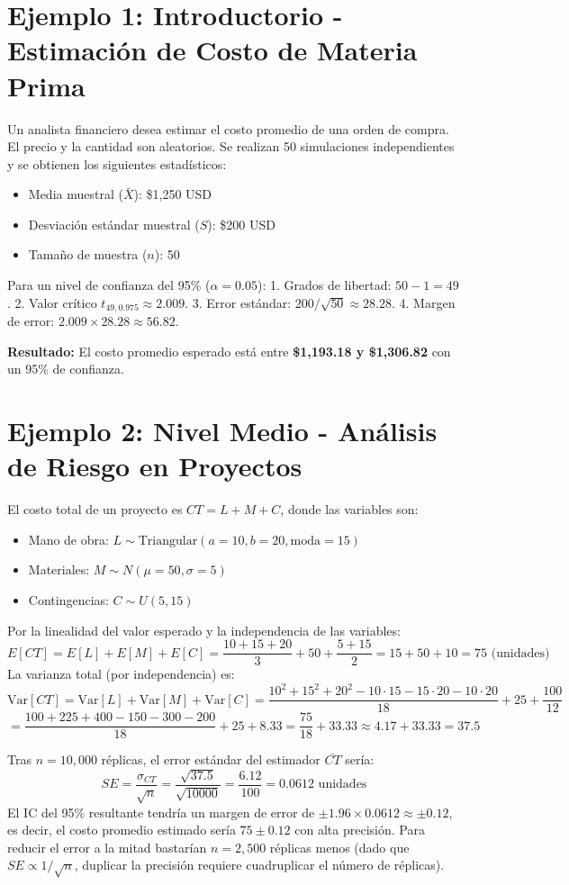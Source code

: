 \documentclass[11pt, letterpaper]{article}
\begin{document}
\section{Ejemplo 1: Introductorio - Estimación de Costo de Materia Prima}
Un analista financiero desea estimar el costo promedio de una orden de compra. El precio y la cantidad son aleatorios. Se realizan 50 simulaciones independientes y se obtienen los siguientes estadísticos:
\begin{itemize}
    \item Media muestral ($\bar{X}$): \$1,250 USD
    \item Desviación estándar muestral ($S$): \$200 USD
    \item Tamaño de muestra ($n$): 50
\end{itemize}

Para un nivel de confianza del 95\% ($\alpha = 0.05$):
1. Grados de libertad: $50 - 1 = 49$.
2. Valor crítico $t_{49, 0.975} \approx 2.009$.
3. Error estándar: $200 / \sqrt{50} \approx 28.28$.
4. Margen de error: $2.009 \times 28.28 \approx 56.82$.

\textbf{Resultado:} El costo promedio esperado está entre \textbf{\$1,193.18 y \$1,306.82} con un 95\% de confianza.

\section{Ejemplo 2: Nivel Medio - Análisis de Riesgo en Proyectos}
El costo total de un proyecto es $CT = L + M + C$, donde las variables son:
\begin{itemize}
    \item Mano de obra: $L \sim \text{Triangular}(a=10, b=20, \text{moda}=15)$
    \item Materiales: $M \sim N(\mu=50, \sigma=5)$
    \item Contingencias: $C \sim U(5, 15)$
\end{itemize}
Por la linealidad del valor esperado y la independencia de las variables:
\[ E[CT] = E[L] + E[M] + E[C] = \frac{10+15+20}{3} + 50 + \frac{5+15}{2} = 15 + 50 + 10 = 75 \text{ (unidades)} \]
La varianza total (por independencia) es:
\[ \text{Var}[CT] = \text{Var}[L] + \text{Var}[M] + \text{Var}[C] = \frac{10^2+15^2+20^2-10\cdot15-15\cdot20-10\cdot20}{18} + 25 + \frac{100}{12} \]
\[ = \frac{100+225+400-150-300-200}{18} + 25 + 8.33 = \frac{75}{18} + 33.33 \approx 4.17 + 33.33 = 37.5 \]

Tras $n = 10{,}000$ réplicas, el error estándar del estimador $\bar{CT}$ sería:
\[ SE = \frac{\sigma_{CT}}{\sqrt{n}} = \frac{\sqrt{37.5}}{\sqrt{10000}} = \frac{6.12}{100} = 0.0612 \text{ unidades} \]
El IC del 95\% resultante tendría un margen de error de $\pm 1.96 \times 0.0612 \approx \pm 0.12$, es decir, el costo promedio estimado sería $75 \pm 0.12$ con alta precisión. Para reducir el error a la mitad bastarían $n = 2{,}500$ réplicas menos (dado que $SE \propto 1/\sqrt{n}$, duplicar la precisión requiere cuadruplicar el número de réplicas).
\end{document}
